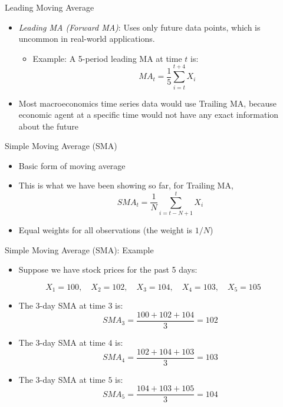 \documentclass[aspectratio=1610]{beamer}
\begin{document}
\begin{frame}[wide]{Leading Moving Average}
	\begin{itemize}
		\item \textit{Leading MA (Forward MA)}: Uses only future data points, which is uncommon in real-world applications.
		\vspace{1mm}
		\begin{itemize}
			\item Example: A 5-period leading MA at time \( t \) is:
		\[
		MA_t = \frac{1}{5} \sum_{i=t}^{t+4} X_i
		\]
		\end{itemize}
		\vspace{3mm}
		\item Most macroeconomics time series data would use Trailing MA, because economic agent at a specific time would not have any exact information about the future 
	\end{itemize}
\end{frame}

\begin{frame}[wide]{Simple Moving Average (SMA)}
	\begin{itemize}
		\item Basic form of moving average
		\item This is what we have been showing so far, for Trailing MA, 
		\[
		SMA_t = \frac{1}{N} \sum_{i=t-N+1}^{t} X_i
		\]
		\item Equal weights for all observations (the weight is $1/N$)
	\end{itemize}
\end{frame}

\begin{frame}[wide]{Simple Moving Average (SMA): Example}
	\begin{itemize}
		\item Suppose we have stock prices for the past 5 days:
	\end{itemize}
	\[
	X_{1} = 100, \quad X_{2} = 102, \quad X_{3} = 104, \quad X_{4} = 103, \quad X_5 = 105
	\]
	\begin{itemize}
		\item The 3-day SMA at time \( 3 \) is:
		\[
		SMA_{3} = \frac{100 + 102 + 104 }{3} = 102
		\]
		\item The 3-day SMA at time \( 4 \) is:
		\[
		SMA_4 = \frac{102 + 104 + 103 }{3} = 103
		\]
		\item The 3-day SMA at time \( 5 \) is:
		\[
		SMA_5 = \frac{104 + 103 + 105}{3} = 104
		\]
	\end{itemize}
\end{frame}
\end{document}
